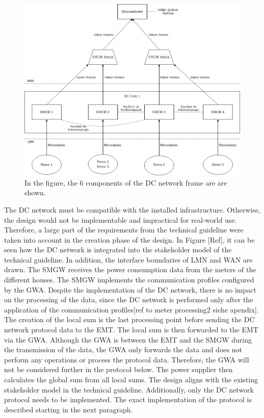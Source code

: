 \begin{figure}[tbp]
  \centering
  \includegraphics[width=1\textwidth]{images/Top-down.png}
  \caption[DC Network Compatibility with TR]{
In the figure, the 6 components of the DC network frame are
are shown.}
  \label{fig:frame}
\end{figure}
The DC network must be compatible with the installed infrastructure. Otherwise, the design would not be implementable and impractical for real-world use. Therefore, a large part of the requirements from the technical guideline were taken into account in the creation phase of the design. In Figure [Ref], it can be seen how the DC network is integrated into the stakeholder model of the technical guideline. In addition, the interface boundaries of LMN and WAN are drawn. The SMGW receives the power consumption data from the meters of the different houses. The SMGW implements the communication profiles configured by the GWA. Despite the implementation of the DC network, there is no impact on the processing of the data, since the DC network is performed only after the application of the communication profiles[ref to meter processing2 siehe apendix]. The creation of the local sum is the last processing point before sending the DC network protocol data to the EMT. The local sum is then forwarded to the EMT via the GWA. Although the GWA is between the EMT and the SMGW during the transmission of the data, the GWA only forwards the data and does not perform any operations or process the protocol data. Therefore, the GWA will not be considered further in the protocol below. The power supplier then calculates the global sum from all local sums. The design aligns with the existing stakeholder model in the technical guideline. Additionally, only the DC network protocol needs to be implemented. The exact implementation of the protocol is described starting in the next paragraph. \\
